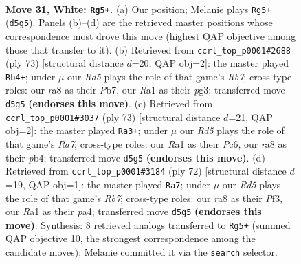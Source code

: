\documentclass[11pt]{article}
\begin{document}
\clearpage

\begin{figure}[p]\centering
\begin{subfigure}{0.46\textwidth}\centering
\resizebox{\linewidth}{!}{%
\newchessgame
\chessboard[
  setfen={r5k1/5r2/8/3R4/p5p1/P7/6KP/R7 w - - 1 31},
  showmover=false,
  pgfstyle=straightmove, color=movearrow, markmove={d5-g5}
]}
\caption{}
\end{subfigure}\hfill
\begin{subfigure}{0.46\textwidth}\centering
\resizebox{\linewidth}{!}{%
\newchessgame
\chessboard[
  setfen={6k1/1p6/p6p/P4R1P/4K3/6P1/1r6/8 b - - 0 37},
  showmover=false,
  pgfstyle=straightmove, color=movearrow, markmove={b2-b4}
]}
\caption{}
\end{subfigure}
\\[4pt]
\begin{subfigure}{0.46\textwidth}\centering
\resizebox{\linewidth}{!}{%
\newchessgame
\chessboard[
  setfen={8/1R6/2p2k1p/4p3/1P2P2P/3K4/r7/8 b - - 1 37},
  showmover=false,
  pgfstyle=straightmove, color=movearrow, markmove={a2-a3}
]}
\caption{}
\end{subfigure}\hfill
\begin{subfigure}{0.46\textwidth}\centering
\resizebox{\linewidth}{!}{%
\newchessgame
\chessboard[
  setfen={6k1/1R6/6p1/7p/pP3K1P/5P2/6r1/8 w - - 0 37},
  showmover=false,
  pgfstyle=straightmove, color=movearrow, markmove={b7-a7}
]}
\caption{}
\end{subfigure}
\caption{\textbf{Move 31, White: \texttt{Rg5+}.} (a) Our position; Melanie plays \texttt{Rg5+} (\texttt{d5g5}). Panels (b)--(d) are the retrieved master positions whose correspondence most drove this move (highest QAP objective among those that transfer to it). (b) Retrieved from \texttt{ccrl\_top\_p0001\#2688} (ply 73) [structural distance $d$=20, QAP obj=2]: the master played \texttt{Rb4+}; under $\mu$ our \emph{Rd5} plays the role of that game's \emph{Rb7}; cross-type roles: our \emph{r}a8 as their \emph{P}b7, our \emph{R}a1 as their \emph{p}g3; transferred move \texttt{d5g5} \textbf{(endorses this move)}. (c) Retrieved from \texttt{ccrl\_top\_p0001\#3037} (ply 73) [structural distance $d$=21, QAP obj=2]: the master played \texttt{Ra3+}; under $\mu$ our \emph{Rd5} plays the role of that game's \emph{Ra7}; cross-type roles: our \emph{R}a1 as their \emph{P}c6, our \emph{r}a8 as their \emph{p}b4; transferred move \texttt{d5g5} \textbf{(endorses this move)}. (d) Retrieved from \texttt{ccrl\_top\_p0001\#3184} (ply 72) [structural distance $d$=19, QAP obj=1]: the master played \texttt{Ra7}; under $\mu$ our \emph{Rd5} plays the role of that game's \emph{Rb7}; cross-type roles: our \emph{r}a8 as their \emph{P}f3, our \emph{R}a1 as their \emph{p}a4; transferred move \texttt{d5g5} \textbf{(endorses this move)}. Synthesis: 8 retrieved analogs transferred to \texttt{Rg5+} (summed QAP objective 10, the strongest correspondence among the candidate moves); Melanie committed it via the \texttt{search} selector.}
\label{fig:thought-m60}
\end{figure}
\end{document}
